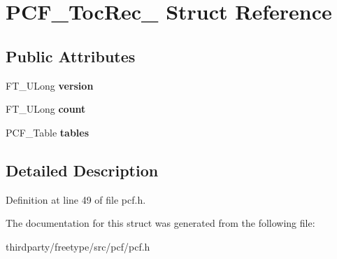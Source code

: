 \hypertarget{struct_p_c_f___toc_rec__}{}\section{P\+C\+F\+\_\+\+Toc\+Rec\+\_\+ Struct Reference}
\label{struct_p_c_f___toc_rec__}
\subsection*{Public Attributes}
\begin{DoxyCompactItemize}
\item 
\mbox{\label{struct_p_c_f___toc_rec___a9fefff153035611d6f1cb379859d84e7}} 
F\+T\+\_\+\+U\+Long {\bfseries version}
\item 
\mbox{\label{struct_p_c_f___toc_rec___aa554adf7485a87f284b1ef39894e23fd}} 
F\+T\+\_\+\+U\+Long {\bfseries count}
\item 
\mbox{\label{struct_p_c_f___toc_rec___a29dabfeb5edce56ffb4ca3b662d13a42}} 
P\+C\+F\+\_\+\+Table {\bfseries tables}
\end{DoxyCompactItemize}


\subsection{Detailed Description}


Definition at line 49 of file pcf.\+h.



The documentation for this struct was generated from the following file\+:\begin{DoxyCompactItemize}
\item 
thirdparty/freetype/src/pcf/pcf.\+h\end{DoxyCompactItemize}
